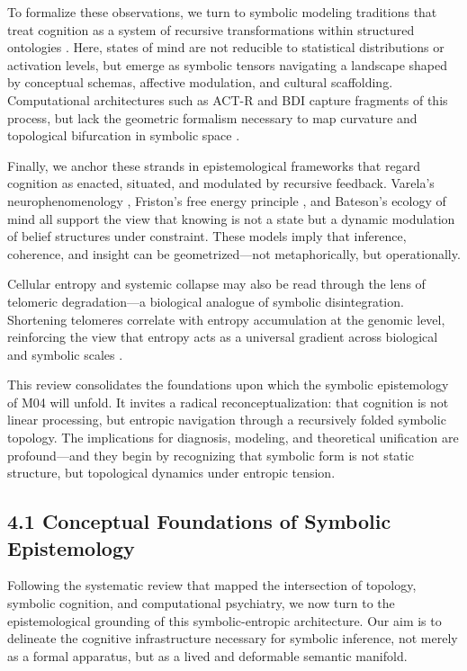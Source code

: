 To formalize these observations, we turn to symbolic modeling traditions that treat cognition as a system of recursive transformations within structured ontologies \cite{fodor1975language, piaget1970genetic}. Here, states of mind are not reducible to statistical distributions or activation levels, but emerge as symbolic tensors navigating a landscape shaped by conceptual schemas, affective modulation, and cultural scaffolding. Computational architectures such as ACT-R and BDI capture fragments of this process, but lack the geometric formalism necessary to map curvature and topological bifurcation in symbolic space \cite{anderson1996actr, rao1995bdi}.

Finally, we anchor these strands in epistemological frameworks that regard cognition as enacted, situated, and modulated by recursive feedback. Varela’s neurophenomenology \cite{varela1996neurophenomenology}, Friston’s free energy principle \cite{friston2010free}, and Bateson’s ecology of mind \cite{bateson1979mind} all support the view that knowing is not a state but a dynamic modulation of belief structures under constraint. These models imply that inference, coherence, and insight can be geometrized—not metaphorically, but operationally.


Cellular entropy and systemic collapse may also be read through the lens of telomeric degradation—a biological analogue of symbolic disintegration. Shortening telomeres correlate with entropy accumulation at the genomic level, reinforcing the view that entropy acts as a universal gradient across biological and symbolic scales \cite{blackburn2015telomeres, lopezotin2013hallmarks}.

This review consolidates the foundations upon which the symbolic epistemology of M04 will unfold. It invites a radical reconceptualization: that cognition is not linear processing, but entropic navigation through a recursively folded symbolic topology. The implications for diagnosis, modeling, and theoretical unification are profound—and they begin by recognizing that symbolic form is not static structure, but topological dynamics under entropic tension.

\subsection*{4.1 Conceptual Foundations of Symbolic Epistemology}

Following the systematic review that mapped the intersection of topology, symbolic cognition, and computational psychiatry, we now turn to the epistemological grounding of this symbolic-entropic architecture. Our aim is to delineate the cognitive infrastructure necessary for symbolic inference, not merely as a formal apparatus, but as a lived and deformable semantic manifold.

